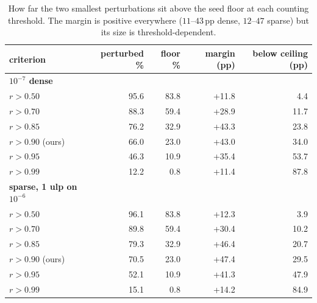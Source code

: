 \begin{table}[htbp]
\caption{How far the two smallest perturbations sit above the seed floor at each counting threshold. The margin is positive everywhere ($11$--$43$\,pp dense, $12$--$47$ sparse) but its size is threshold-dependent.}
\label{tab:dosemargin}
\centering\small
\begin{tabular}{lrrrr}
\toprule
criterion & perturbed \% & floor \% & margin (pp) & below ceiling (pp) \\
\midrule
\textbf{$10^{-7}$ dense} &  &  &  &  \\
$r>0.50$ & 95.6 & 83.8 & +11.8 & 4.4 \\
$r>0.70$ & 88.3 & 59.4 & +28.9 & 11.7 \\
$r>0.85$ & 76.2 & 32.9 & +43.3 & 23.8 \\
$r>0.90$ (ours) & 66.0 & 23.0 & +43.0 & 34.0 \\
$r>0.95$ & 46.3 & 10.9 & +35.4 & 53.7 \\
$r>0.99$ & 12.2 & 0.8 & +11.4 & 87.8 \\
\midrule
\textbf{sparse, 1 ulp on $10^{-6}$} &  &  &  &  \\
$r>0.50$ & 96.1 & 83.8 & +12.3 & 3.9 \\
$r>0.70$ & 89.8 & 59.4 & +30.4 & 10.2 \\
$r>0.85$ & 79.3 & 32.9 & +46.4 & 20.7 \\
$r>0.90$ (ours) & 70.5 & 23.0 & +47.4 & 29.5 \\
$r>0.95$ & 52.1 & 10.9 & +41.3 & 47.9 \\
$r>0.99$ & 15.1 & 0.8 & +14.2 & 84.9 \\
\bottomrule
\end{tabular}
\end{table}

